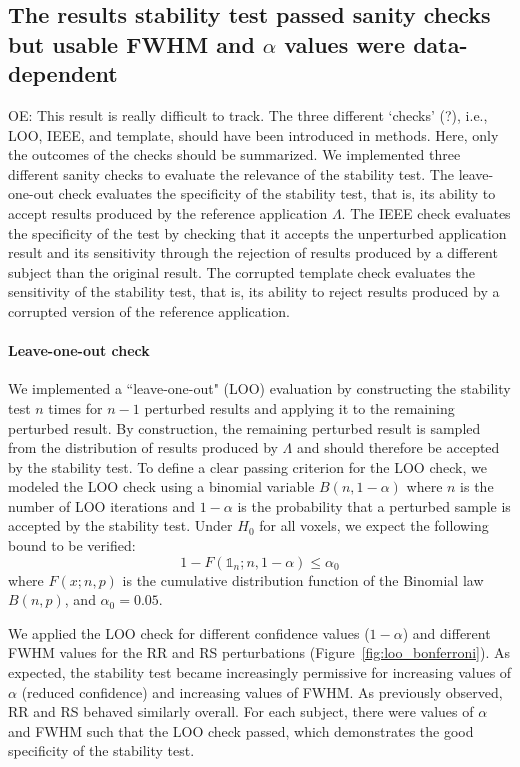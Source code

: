 \documentclass[lettersize,journal]{IEEEtran}
\newcommand{\oesteban}[1]{\color{orange}\textsc{OE:} #1\color{black}\xspace}
\begin{document}
\subsection{The results stability test passed sanity checks but usable FWHM and $\alpha$ values were data-dependent}
\oesteban{This result is really difficult to track. The three different `checks' (?), i.e., LOO, IEEE, and template, should have been introduced in methods. Here, only the outcomes of the checks should be summarized.}
We implemented three different sanity checks to evaluate the relevance of the stability test.
The leave-one-out check evaluates the specificity of the stability test, that is, its ability to accept results produced by the reference application $\Lambda$.
The IEEE check evaluates the specificity of the test by checking that it accepts the unperturbed application result and its sensitivity through the rejection of results produced by a different subject than the original result.
The corrupted template check evaluates the sensitivity of the stability test, that is, its ability to reject results produced by a corrupted version of the reference application.

\paragraph{Leave-one-out check} We implemented a ``leave-one-out" (LOO) evaluation by constructing the stability test $n$ times for $n-1$ perturbed results and applying it to the remaining perturbed result. By construction, the remaining perturbed result is sampled from the distribution of results produced by $\Lambda$ and should therefore be accepted by the stability test.
To define a clear passing criterion for the LOO check, we modeled the LOO check using a binomial variable $B(n,1-\alpha)$ where $n$ is the number of LOO iterations and $1-\alpha$ is the probability that a perturbed sample is accepted by the stability test. Under $H_0$ for all voxels, we expect the following bound to be verified:
\[
    1-F(\mathds{1}_n;n,1-\alpha) \leq \alpha_0
\]
where $F(x;n,p)$ is the cumulative distribution function of the Binomial law $B(n,p)$, and $\alpha_0=0.05$.

We applied the LOO check for different confidence values ($1-\alpha$) and different FWHM  values for the RR and RS perturbations (Figure~\ref{fig:loo_bonferroni}). As expected, the stability test became increasingly permissive for increasing values of $\alpha$ (reduced confidence) and increasing values of FWHM. As previously observed, RR and RS behaved similarly overall. For each subject, there were values of $\alpha$ and FWHM such that the LOO check passed, which demonstrates the good specificity of the stability test.
\end{document}
